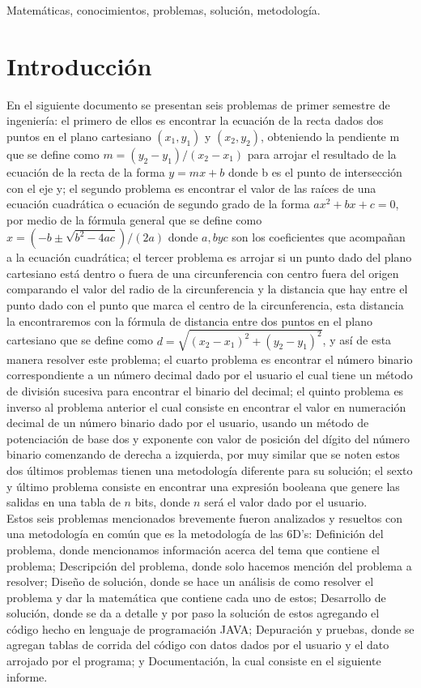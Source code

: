 \documentclass[conference]{IEEEtran}
\begin{document}
\begin{IEEEkeywords}
    Matemáticas, conocimientos, problemas, solución, metodología.
\end{IEEEkeywords}

\section{Introducción}
En el siguiente documento se presentan seis problemas de primer semestre de ingeniería: el primero de ellos es encontrar la ecuación de la recta dados dos puntos en el plano cartesiano $(x_1, y_1)$ y $(x_2, y_2)$, obteniendo la pendiente m que se define como $ m = (y_2 - y_1)/(x_2 - x_1) $ para arrojar el resultado de la ecuación de la recta de la forma $ y= m x + b $ donde b es el punto de intersección con el eje y; el segundo problema es encontrar el valor de las raíces de una ecuación cuadrática o ecuación de segundo grado de la forma $ ax^2 +bx + c = 0 $, por medio de la fórmula general que se define como $ x = (-b\pm \sqrt{b^2-4ac})/(2a) $ donde $a, b y c$ son los coeficientes que acompañan a la ecuación cuadrática; el tercer problema es arrojar si un punto dado del plano cartesiano está dentro o fuera de una circunferencia con centro fuera del origen comparando el valor del radio de la circunferencia y la distancia que hay entre el punto dado con el punto que marca el centro de la circunferencia, esta distancia la encontraremos con la fórmula de distancia entre dos puntos en el plano cartesiano que se define como $d=\sqrt{(x_2-x_1)^2+(y_2-y_1)^2}$, y así de esta manera resolver este problema; el cuarto problema es encontrar el número binario correspondiente a un número decimal dado por el usuario el cual tiene un método de división sucesiva para encontrar el binario del decimal; el quinto problema es inverso al problema anterior el cual consiste en encontrar el valor en numeración decimal de un número binario dado por el usuario, usando un método de potenciación de base dos y exponente con valor de posición del dígito del número binario comenzando de derecha a izquierda, por muy similar que se noten estos dos últimos problemas tienen una metodología diferente para su solución; el sexto y último problema consiste en encontrar una expresión booleana que genere las salidas en una tabla de $n$ bits, donde $n$ será el valor dado por el usuario.\\

Estos seis problemas mencionados brevemente fueron analizados y resueltos con una metodología en común que es la metodología de las 6D's: Definición del problema, donde mencionamos información acerca del tema que contiene el problema; Descripción del problema, donde solo hacemos mención del problema a resolver; Diseño de solución, donde se hace un análisis de como resolver el problema y dar la matemática que contiene cada uno de estos; Desarrollo de solución, donde se da a detalle y por paso la solución de estos agregando el código hecho en lenguaje de programación JAVA; Depuración y pruebas, donde se agregan tablas de corrida del código con datos dados por el usuario y el dato arrojado por el programa; y Documentación, la cual consiste en el siguiente informe.
\end{document}
